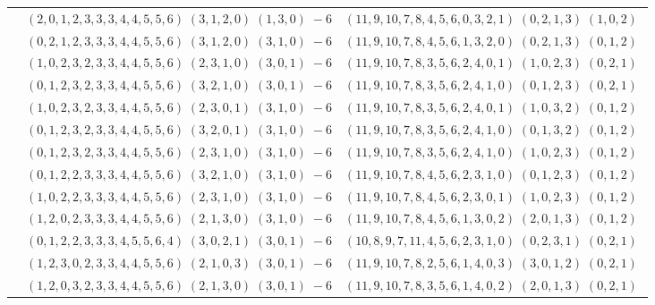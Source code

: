 \documentclass[11pt]{article}
\begin{document}
\begin{longtable}[l]{|c|c|c|}
 \cline{2-3} 
 & $(2 ,0 ,1 ,2 ,3 ,3 ,3 ,4 ,4 ,5 ,5 ,6) \;(3 ,1 ,2 ,0) \;(1 ,3 ,0) \;-6$ & $(11 ,9 ,10 ,7 ,8 ,4 ,5 ,6 ,0 ,3 ,2 ,1) \;(0 ,2 ,1 ,3) \;(1 ,0 ,2) \;$\\ 
 \cline{2-3} 
 & $(0 ,2 ,1 ,2 ,3 ,3 ,3 ,4 ,4 ,5 ,5 ,6) \;(3 ,1 ,2 ,0) \;(3 ,1 ,0) \;-6$ & $(11 ,9 ,10 ,7 ,8 ,4 ,5 ,6 ,1 ,3 ,2 ,0) \;(0 ,2 ,1 ,3) \;(0 ,1 ,2) \;$\\ 
 \cline{2-3} 
 & $(1 ,0 ,2 ,3 ,2 ,3 ,3 ,4 ,4 ,5 ,5 ,6) \;(2 ,3 ,1 ,0) \;(3 ,0 ,1) \;-6$ & $(11 ,9 ,10 ,7 ,8 ,3 ,5 ,6 ,2 ,4 ,0 ,1) \;(1 ,0 ,2 ,3) \;(0 ,2 ,1) \;$\\ 
 \cline{2-3} 
 & $(0 ,1 ,2 ,3 ,2 ,3 ,3 ,4 ,4 ,5 ,5 ,6) \;(3 ,2 ,1 ,0) \;(3 ,0 ,1) \;-6$ & $(11 ,9 ,10 ,7 ,8 ,3 ,5 ,6 ,2 ,4 ,1 ,0) \;(0 ,1 ,2 ,3) \;(0 ,2 ,1) \;$\\ 
 \cline{2-3} 
 & $(1 ,0 ,2 ,3 ,2 ,3 ,3 ,4 ,4 ,5 ,5 ,6) \;(2 ,3 ,0 ,1) \;(3 ,1 ,0) \;-6$ & $(11 ,9 ,10 ,7 ,8 ,3 ,5 ,6 ,2 ,4 ,0 ,1) \;(1 ,0 ,3 ,2) \;(0 ,1 ,2) \;$\\ 
 \cline{2-3} 
 & $(0 ,1 ,2 ,3 ,2 ,3 ,3 ,4 ,4 ,5 ,5 ,6) \;(3 ,2 ,0 ,1) \;(3 ,1 ,0) \;-6$ & $(11 ,9 ,10 ,7 ,8 ,3 ,5 ,6 ,2 ,4 ,1 ,0) \;(0 ,1 ,3 ,2) \;(0 ,1 ,2) \;$\\ 
 \cline{2-3} 
 & $(0 ,1 ,2 ,3 ,2 ,3 ,3 ,4 ,4 ,5 ,5 ,6) \;(2 ,3 ,1 ,0) \;(3 ,1 ,0) \;-6$ & $(11 ,9 ,10 ,7 ,8 ,3 ,5 ,6 ,2 ,4 ,1 ,0) \;(1 ,0 ,2 ,3) \;(0 ,1 ,2) \;$\\ 
 \cline{2-3} 
 & $(0 ,1 ,2 ,2 ,3 ,3 ,3 ,4 ,4 ,5 ,5 ,6) \;(3 ,2 ,1 ,0) \;(3 ,1 ,0) \;-6$ & $(11 ,9 ,10 ,7 ,8 ,4 ,5 ,6 ,2 ,3 ,1 ,0) \;(0 ,1 ,2 ,3) \;(0 ,1 ,2) \;$\\ 
 \cline{2-3} 
 & $(1 ,0 ,2 ,2 ,3 ,3 ,3 ,4 ,4 ,5 ,5 ,6) \;(2 ,3 ,1 ,0) \;(3 ,1 ,0) \;-6$ & $(11 ,9 ,10 ,7 ,8 ,4 ,5 ,6 ,2 ,3 ,0 ,1) \;(1 ,0 ,2 ,3) \;(0 ,1 ,2) \;$\\ 
 \cline{2-3} 
 & $(1 ,2 ,0 ,2 ,3 ,3 ,3 ,4 ,4 ,5 ,5 ,6) \;(2 ,1 ,3 ,0) \;(3 ,1 ,0) \;-6$ & $(11 ,9 ,10 ,7 ,8 ,4 ,5 ,6 ,1 ,3 ,0 ,2) \;(2 ,0 ,1 ,3) \;(0 ,1 ,2) \;$\\ 
 \cline{2-3} 
 & $(0 ,1 ,2 ,2 ,3 ,3 ,3 ,4 ,5 ,5 ,6 ,4) \;(3 ,0 ,2 ,1) \;(3 ,0 ,1) \;-6$ & $(10 ,8 ,9 ,7 ,11 ,4 ,5 ,6 ,2 ,3 ,1 ,0) \;(0 ,2 ,3 ,1) \;(0 ,2 ,1) \;$\\ 
 \cline{2-3} 
 & $(1 ,2 ,3 ,0 ,2 ,3 ,3 ,4 ,4 ,5 ,5 ,6) \;(2 ,1 ,0 ,3) \;(3 ,0 ,1) \;-6$ & $(11 ,9 ,10 ,7 ,8 ,2 ,5 ,6 ,1 ,4 ,0 ,3) \;(3 ,0 ,1 ,2) \;(0 ,2 ,1) \;$\\ 
 \cline{2-3} 
 & $(1 ,2 ,0 ,3 ,2 ,3 ,3 ,4 ,4 ,5 ,5 ,6) \;(2 ,1 ,3 ,0) \;(3 ,0 ,1) \;-6$ & $(11 ,9 ,10 ,7 ,8 ,3 ,5 ,6 ,1 ,4 ,0 ,2) \;(2 ,0 ,1 ,3) \;(0 ,2 ,1) \;$\\ 

\end{longtable}
\end{document}
